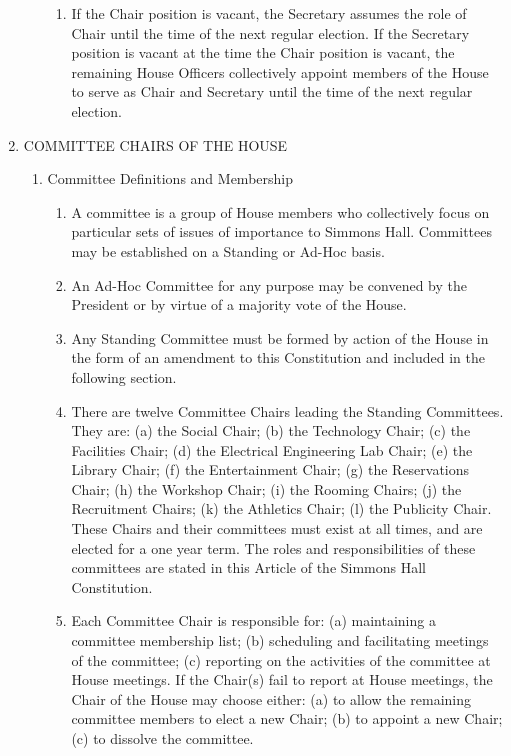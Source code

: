 \documentclass[letterpaper]{article}
\begin{document}
\begin{enumerate}
\begin{enumerate}
\begin{enumerate}
\item If the Chair position is vacant, the Secretary assumes the role of Chair until the time of the next regular election. If the Secretary position is vacant at the time the Chair position is vacant, the remaining House Officers collectively appoint members of the House to serve as Chair and Secretary until the time of the next regular
election.

\end{enumerate}

\end{enumerate}

\item COMMITTEE CHAIRS OF THE HOUSE 

\begin{enumerate}

\item Committee Definitions and Membership 

\begin{enumerate}

\item A committee is a group of House members who collectively focus on particular sets of issues of importance to Simmons Hall. Committees may be established on a Standing or Ad-Hoc basis.

\item An Ad-Hoc Committee for any purpose may be convened by the President or by virtue of a majority vote of the House.

\item Any Standing Committee must be formed by action of the House in the form of an amendment to this Constitution and included in the following section.

\item There are twelve Committee Chairs leading the Standing Committees. They are: (a) the Social Chair; (b) the Technology Chair; (c) the Facilities Chair; (d) the Electrical Engineering Lab Chair; (e) the Library Chair; (f) the Entertainment Chair; (g) the Reservations Chair; (h) the Workshop Chair; (i) the Rooming Chairs; (j) the Recruitment Chairs; (k) the Athletics Chair; (l) the Publicity Chair. These Chairs and their committees must exist at all times, and are elected for a one year term. The roles and responsibilities of these committees are stated in this Article of the Simmons Hall Constitution.

\item Each Committee Chair is responsible for: (a) maintaining a committee membership list; (b) scheduling and facilitating meetings of the committee; (c) reporting on the activities of the committee at House meetings. If the Chair(s) fail to report at House meetings, the Chair of the House may choose either: (a) to allow the remaining committee members to elect a new Chair; (b) to appoint a new Chair; (c) to dissolve the committee.


\end{enumerate}
\end{enumerate}
\end{enumerate}
\end{document}
